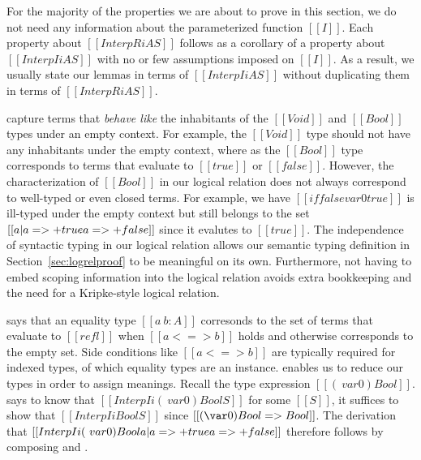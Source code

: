 \documentclass[acmsmall,screen=true,
\ifpublic review=false\else,review=true\fi
  ,anonymous=\ifanonymous true\else false\fi]{acmart}
\newcommand{\yl}[1]{}
\begin{document}
For the majority of the properties we are about to prove in this section, we
do not need any information about the parameterized function $[[I]]$.
Each property about $[[InterpR i A S]]$ follows as a corollary of
a property about $[[Interp I i A S]]$ with no or few assumptions imposed on
$[[I]]$. As a result, we usually state our lemmas in terms of
$[[Interp I i A S]]$ without duplicating them in terms of $[[InterpR i
A S]]$.

 capture terms that \emph{behave like} the inhabitants
of the $[[Void]]$ and $[[Bool]]$ types under an empty context. For
example, the $[[Void]]$ type should not have any inhabitants under the
empty context, where as the $[[Bool]]$ type corresponds to terms that
evaluate to $[[true]]$ or $[[false]]$. However, the characterization
of $[[Bool]]$ in our logical relation does not always correspond to
well-typed or even closed terms. For example, we have $[[if false var 0
true]]$ is ill-typed under the empty context but still belongs to the set $[[{ a | a =>+
  true \/ a =>+ false }]]$ since it evalutes to $[[true]]$.
The independence of syntactic typing in our logical relation allows
our semantic typing definition in Section~\ref{sec:logrelproof} to be
meaningful on its own. Furthermore, not having to embed scoping
information into the logical relation avoids extra bookkeeping and the
need for a Kripke-style logical relation.
\yl{Not sure what to cite from Derek Dreyer. I know his blog post
  about semantic type soundness but is there a good paper to cite? one
of the rust papers?}

says that an equality type $[[a ~ b : A]]$ corresonds to the
set of terms that evaluate to $[[refl]]$ when $[[a <=> b]]$ holds and
otherwise corresponds to the empty set. Side conditions like $[[a <=>
b]]$ are typically required for indexed types, of which equality types
are an instance.  enables us to reduce our types in order
to assign meanings. Recall the type expression $[[(\ var 0)
Bool]]$.  says to know that
$[[Interp I i  (\ var 0) Bool S ]]$ for some $[[S]]$, it suffices to
show that $[[Interp I i Bool S]]$ since $[[(\var 0) Bool =>
Bool]]$. The derivation that $[[Interp I i (\ var 0) Bool { a | a =>+
  true \/ a =>+ false }]]$ therefore follows by composing 
and .
\end{document}
